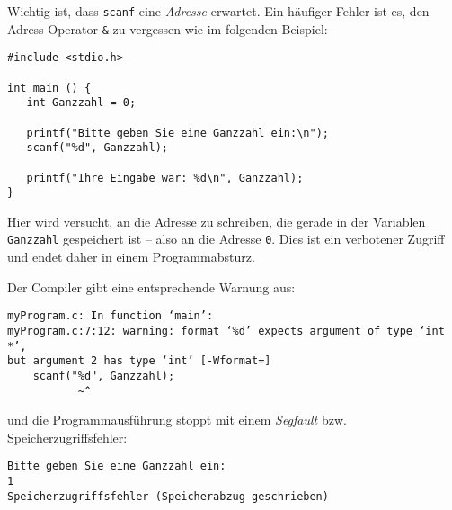 \begin{warnbox}
Wichtig ist, dass \texttt{scanf} eine \emph{Adresse} erwartet. Ein häufiger Fehler ist es, den Adress-Operator \texttt{\&} zu vergessen wie im folgenden Beispiel:

\begin{warnbox}[Beispiel: Eine Ganzzahl mit \texttt{scanf} einlesen, leftupper=7mm]
\begin{verbatim}
#include <stdio.h>

int main () {
   int Ganzzahl = 0;
   
   printf("Bitte geben Sie eine Ganzzahl ein:\n");
   scanf("%d", Ganzzahl);
   
   printf("Ihre Eingabe war: %d\n", Ganzzahl);
}
\end{verbatim}
\end{warnbox}

Hier wird versucht, an die Adresse zu schreiben, die gerade in der Variablen \texttt{Ganzzahl} gespeichert ist -- also an die Adresse \texttt{0}. Dies ist ein verbotener Zugriff und endet daher in einem Programmabsturz.

Der Compiler gibt eine entsprechende Warnung aus:
\begin{cmdbox}
\begin{verbatim}
myProgram.c: In function ‘main’:
myProgram.c:7:12: warning: format ‘%d’ expects argument of type ‘int *’, 
but argument 2 has type ‘int’ [-Wformat=]
    scanf("%d", Ganzzahl);
           ~^
\end{verbatim}
\end{cmdbox}

und die Programmausführung stoppt mit einem \emph{Segfault} bzw. Speicherzugriffsfehler:

\begin{cmdbox}
\begin{verbatim}
Bitte geben Sie eine Ganzzahl ein:
1
Speicherzugriffsfehler (Speicherabzug geschrieben)
\end{verbatim}
\end{cmdbox}
\end{warnbox}

